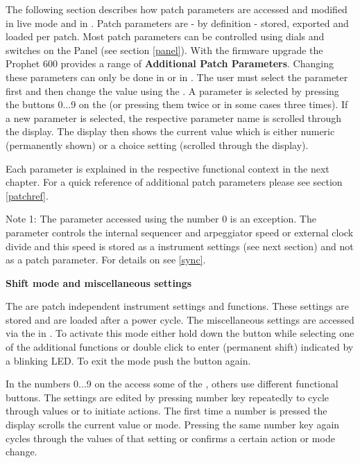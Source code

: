 \documentclass[landscape, 11pt, oneside]{report}
\newenvironment{flowtext}{\addmargin[0cm]{7cm}}{\endaddmargin} %
\begin{document}
\begin{flowtext}
The following section describes how patch parameters are accessed and modified in live mode and in \presetpanel. Patch parameters are - by definition - stored, exported and loaded per patch. Most patch parameters can be controlled using dials and switches on the Panel (see section \ref{panel}). With the firmware upgrade the Prophet 600 provides a range of \textbf{Additional Patch Parameters}. Changing these parameters can only be done in \presetpanel or in \livemode. The user must select the parameter first and then change the value using the \datadial. A parameter is selected by pressing the buttons 0...9 on the \termnumberpad (or pressing them twice or in some cases three times). If a new parameter is selected, the respective parameter name is scrolled through the display. The display then shows the current value which is either numeric (permanently shown) or a choice setting (scrolled through the display). 

Each parameter is explained in the respective functional context in the next chapter. For a quick reference of additional patch parameters please see section \ref{patchref}. 

Note 1: The parameter accessed using the number 0 is an exception. The parameter \clock controls the internal sequencer and arpeggiator speed or external clock divide and this speed is stored as a instrument settings (see next section) and not as a patch parameter. For details on \clock see \ref{sync}.


\textbf{Shift mode and miscellaneous settings}

The \miscsett are patch independent instrument settings and functions. These settings are stored and are loaded after a power cycle. The miscellaneous settings are accessed via the \termnumberpad in \shiftmode. To activate this mode either hold down the button \fromtape while selecting one of the additional functions or double click \fromtape to enter \shiftlock (permanent shift) indicated by a blinking \fromtape LED. To exit the mode push the button again. 

In \shiftmode the numbers 0...9 on the \termnumberpad access some of the \miscsett, others use different functional buttons. The settings are edited by pressing number key repeatedly to cycle through values or to initiate actions. The first time a number is pressed the display scrolls the current value or mode. Pressing the same number key again cycles through the values of that setting or confirms a certain action or mode change. 


\end{flowtext}
\end{document}
